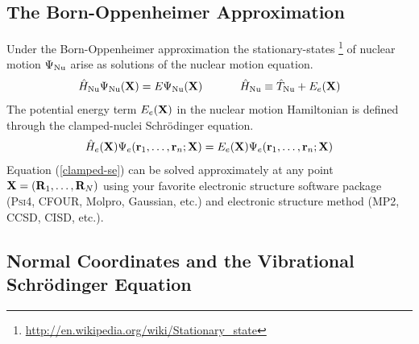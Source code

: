 \documentclass[11pt]{article}
\begin{document}
\subsection{The Born-Oppenheimer Approximation}
Under the Born-Oppenheimer approximation the stationary-states
\footnote{\url{http://en.wikipedia.org/wiki/Stationary_state}} of nuclear
motion $\Psi_{\mathrm{Nu}}$ arise as solutions of the nuclear motion equation.
\begin{align}
\label{pes}
    \hat{H}_{\mathrm{Nu}}
    \Psi_{\mathrm{Nu}}(\mathbf{X})
=
    E
    \Psi_{\mathrm{Nu}}(\mathbf{X})
\ \ \ \ \ \ \ \ \ \ 
    \hat{H}_{\mathrm{Nu}}
\equiv
    \hat{T}_{\mathrm{Nu}}+E_e(\mathbf{X})
\end{align}
The potential energy term $E_e(\mathbf{X})$ in the nuclear motion Hamiltonian is
defined through the clamped-nuclei Schr\"odinger equation.
\begin{align}
\label{clamped-se}
    \hat{H}_e(\mathbf{X})
    \Psi_e(\mathbf{r}_1,\ldots,\mathbf{r}_n;\mathbf{X})
=
    E_e(\mathbf{X})
    \Psi_e(\mathbf{r}_1,\ldots,\mathbf{r}_n;\mathbf{X})
\end{align}
Equation (\ref{clamped-se}) can be solved approximately at any point
$\mathbf{X}=(\mathbf{R}_1,\ldots,\mathbf{R}_N)$ using your favorite electronic structure
software package (\textsc{Psi4}, CFOUR, Molpro, Gaussian, etc.) and electronic
structure method (MP2, CCSD, CISD, etc.).


\subsection{Normal Coordinates and the Vibrational Schr\"odinger Equation}
\end{document}

